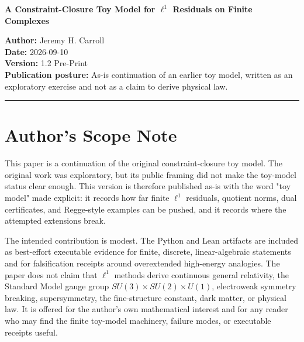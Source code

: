 \documentclass[11pt]{article}
\begin{document}
\thispagestyle{empty}

\begin{center}
{\LARGE\bfseries A Constraint-Closure Toy Model for $\ell^1$ Residuals on Finite Complexes\par}
\vspace{0.45em}{\large Linear Cochain Quotients, Exact Strong Duality, and Regge-Calculus Examples - With Quarantined High-Energy Speculations\par}
\vspace{0.95em}
\begin{minipage}{0.88\textwidth}
\centering
{\small
\textbf{Author:} Jeremy H. Carroll\\[0.28em]
\textbf{Date:} 2026-09-10\\[0.28em]
\textbf{Version:} 1.2 Pre-Print\\[0.28em]
\textbf{Publication posture:} As-is continuation of an earlier toy model, written as an exploratory exercise and not as a claim to derive physical law.
}
\end{minipage}
\end{center}
\vspace{0.75em}


\medskip\hrule\medskip
\section{\texorpdfstring{Author's Scope Note}{Author's Scope Note}}

This paper is a continuation of the original constraint-closure toy model. The original work was exploratory, but its public framing did not make the toy-model status clear enough. This version is therefore published as-is with the word "toy model" made explicit: it records how far finite $\ell^1$ residuals, quotient norms, dual certificates, and Regge-style examples can be pushed, and it records where the attempted extensions break.

The intended contribution is modest. The Python and Lean artifacts are included as best-effort executable evidence for finite, discrete, linear-algebraic statements and for falsification receipts around overextended high-energy analogies. The paper does not claim that $\ell^1$ methods derive continuous general relativity, the Standard Model gauge group $SU(3) \times SU(2) \times U(1)$, electroweak symmetry breaking, supersymmetry, the fine-structure constant, dark matter, or physical law. It is offered for the author's own mathematical interest and for any reader who may find the finite toy-model machinery, failure modes, or executable receipts useful.
\end{document}
